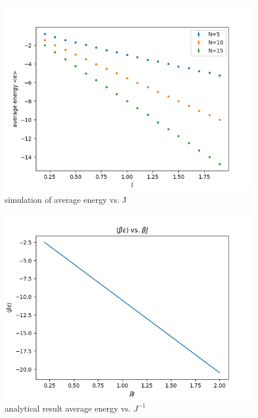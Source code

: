 \documentclass{article}
\begin{document}
\begin{enumerate}
\begin{figure}[htbp]
    \centering
    \includegraphics[width = .8\linewidth]{energy_J.png}
    \caption{simulation of average energy vs. J}
    \label{fig:ener_J}
\end{figure}
\begin{figure}[htbp]
    \centering
    \includegraphics[width = .8\linewidth]{analytic_energy.png}
    \caption{analytical result average energy vs. $J^{-1}$}
    \label{fig:anal_ener}
\end{figure}


\end{enumerate}
\end{document}
